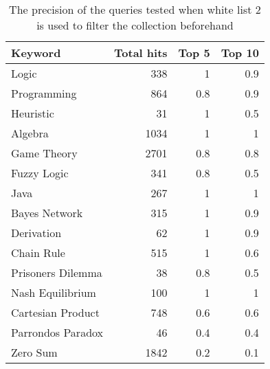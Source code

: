 \begin{table}[h!]
\centering
\begin{tabular} {|| p{15em} | r | r | r ||} 
 \hline
 Keyword & Total hits & Top 5 & Top 10 \\ [0.5ex] 
 \hline

Logic & 338 & 1 & 0.9 \\
Programming & 864 & 0.8 & 0.9 \\
Heuristic & 31 & 1 & 0.5 \\
Algebra & 1034 & 1 & 1 \\
Game Theory & 2701 & 0.8 & 0.8 \\
\hline
Fuzzy Logic & 341 & 0.8 & 0.5 \\
Java & 267 & 1 & 1 \\
Bayes Network & 315 & 1 & 0.9 \\
Derivation & 62 & 1 & 0.9 \\
\hline
Chain Rule & 515 & 1 & 0.6 \\
Prisoners Dilemma & 38 & 0.8 & 0.5 \\
Nash Equilibrium & 100 & 1 & 1 \\
Cartesian Product & 748 & 0.6 & 0.6 \\
Parrondos Paradox & 46 & 0.4 & 0.4 \\
Zero Sum & 1842 & 0.2 & 0.1 \\

 \hline
\end{tabular}
\caption{The precision of the queries tested when white list 2 is used to filter the collection beforehand}
\label{table:p_test_list2}
\end{table}

